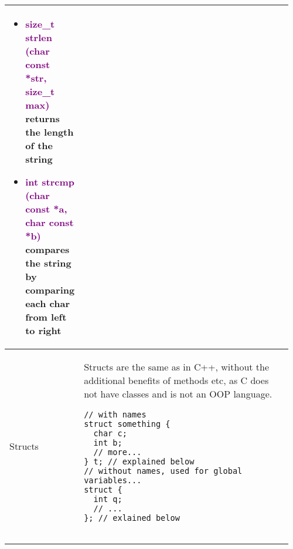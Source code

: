 \documentclass[main.tex,fontsize=8pt,paper=a4,paper=portrait,DIV=calc,]{scrartcl}
\begin{document}
\begin{table}[ht!]
\begin{tabular}{|m{0.2\linewidth}|m{0.755\linewidth}|}
\begin{itemize}
  \item \textcolor{purple}{size\_t strlen (char const *str, size\_t max)}\newline
  returns the length of the string
\item \textcolor{purple}{int strcmp (char const *a, char const *b)}\newline
  compares the string by comparing each char from left to right
\vspace{-3mm}
\end{itemize}\\ 
\hline
Structs & 
Structs are the same as in C++, without the additional benefits of methods etc, as C does not have classes and is not an OOP language.\newline
\begin{lstlisting}
// with names
struct something {
  char c;
  int b; 
  // more...
} t; // explained below
// without names, used for global variables... 
struct {
  int q; 
  // ...
}; // exlained below


\end{lstlisting}
\end{tabular}
\end{table}
\end{document}
